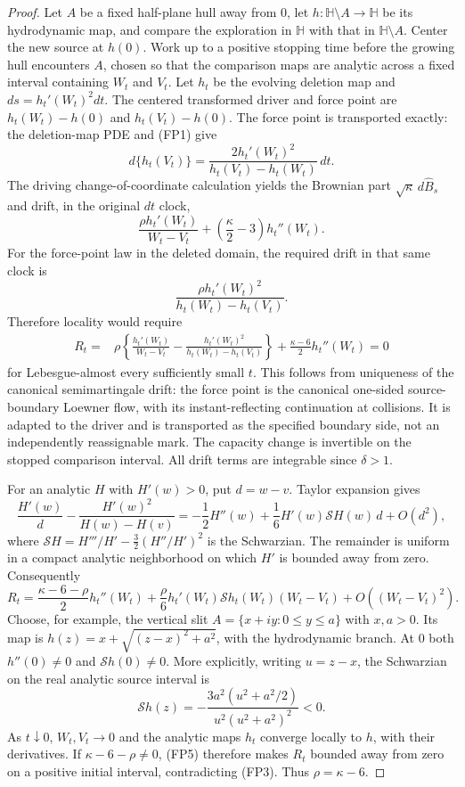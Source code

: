 \documentclass[11pt]{article}
\theoremstyle{definition}\newtheorem{definition}[theorem]{Definition}
\theoremstyle{remark}\newtheorem{remark}[theorem]{Remark}
\begin{document}
\begin{proof}
Let $A$ be a fixed half-plane hull away from $0$, let
$h:\mathbb H\setminus A\to\mathbb H$ be its hydrodynamic map, and
compare the exploration in $\mathbb H$ with that in
$\mathbb H\setminus A$. Center the new source at $h(0)$.
Work up to a positive stopping time before the growing hull encounters
$A$, chosen so that the comparison maps are analytic across a fixed
interval containing $W_t$ and $V_t$. Let $h_t$ be the evolving deletion
map and $ds=h_t'(W_t)^2dt$. The centered transformed driver and force
point are $h_t(W_t)-h(0)$ and $h_t(V_t)-h(0)$.
The force point is transported exactly: the deletion-map PDE and (FP1)
give
\[
 d\{h_t(V_t)\}
 =\frac{2h_t'(W_t)^2}{h_t(V_t)-h_t(W_t)}\,dt.
 \tag{FP2}
\]
The driving change-of-coordinate calculation yields the Brownian part
$\sqrt\kappa\,d\widehat B_s$ and drift, in the original $dt$ clock,
\[
 \frac{\rho h_t'(W_t)}{W_t-V_t}
       +\left(\frac\kappa2-3\right)h_t''(W_t).
\]
For the force-point law in the deleted domain, the required drift in
that same clock is
\[
 \frac{\rho h_t'(W_t)^2}{h_t(W_t)-h_t(V_t)}.
\]
Therefore locality would require
\[
 \begin{split}
 R_t={}&\rho\left\{
 \frac{h_t'(W_t)}{W_t-V_t}
 -\frac{h_t'(W_t)^2}{h_t(W_t)-h_t(V_t)}\right\}
 +\frac{\kappa-6}{2}h_t''(W_t)=0
 \end{split}
 \tag{FP3}
\]
for Lebesgue-almost every sufficiently small $t$.
This follows from uniqueness of the canonical semimartingale drift:
the force point is the canonical one-sided source-boundary Loewner
flow, with its instant-reflecting continuation at collisions. It is
adapted to the driver and is transported as the specified boundary side,
not an independently reassignable mark. The
capacity change is invertible on the stopped comparison interval.
All drift terms are integrable since $\delta>1$.

For an analytic $H$ with $H'(w)>0$, put $d=w-v$. Taylor expansion gives
\[
 \frac{H'(w)}{d}
 -\frac{H'(w)^2}{H(w)-H(v)}
 =-\frac12H''(w)+\frac16 H'(w)\mathcal S H(w)\,d+O(d^2),
 \tag{FP4}
\]
where $\mathcal S H=H'''/H'-\tfrac32(H''/H')^2$ is the Schwarzian.
The remainder is uniform in a compact analytic neighborhood on which
$H'$ is bounded away from zero. Consequently
\[
 R_t=\frac{\kappa-6-\rho}{2}h_t''(W_t)
 +\frac\rho6 h_t'(W_t)\mathcal S h_t(W_t)(W_t-V_t)
 +O((W_t-V_t)^2).
 \tag{FP5}
\]
Choose, for example, the vertical slit
$A=\{x+iy:0\le y\le a\}$ with $x,a>0$. Its map is
$h(z)=x+\sqrt{(z-x)^2+a^2}$, with the hydrodynamic branch.
At $0$ both $h''(0)\ne0$ and $\mathcal S h(0)\ne0$. More explicitly,
writing $u=z-x$, the Schwarzian on the real analytic source interval is
\[
 \mathcal S h(z)
 =-\frac{3a^2(u^2+a^2/2)}{u^2(u^2+a^2)^2}<0.
 \tag{FP6}
\]
As $t\downarrow0$, $W_t,V_t\to0$ and the analytic maps $h_t$ converge
locally to $h$, with their derivatives. If $\kappa-6-\rho\ne0$, (FP5)
therefore makes $R_t$ bounded away from zero on a positive initial
interval, contradicting (FP3). Thus $\rho=\kappa-6$.


\end{proof}
\end{document}
